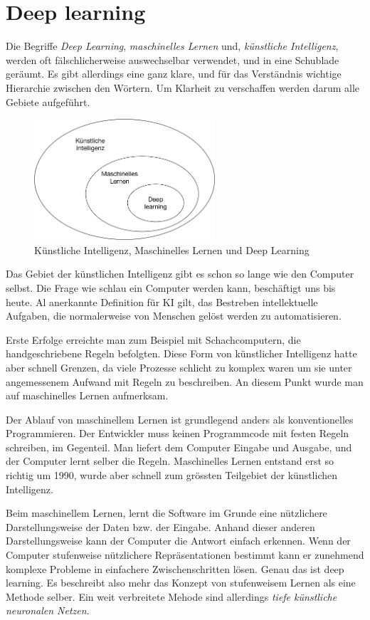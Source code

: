 \section{Deep learning}
Die Begriffe \textit{Deep Learning}, \textit{maschinelles Lernen} und, \textit{künstliche Intelligenz}, werden oft fälschlicherweise auswechselbar verwendet, und in eine Schublade geräumt. Es gibt allerdings eine ganz klare, und für das Verständnis wichtige Hierarchie zwischen den Wörtern. Um Klarheit zu verschaffen werden darum alle Gebiete aufgeführt.

\begin{figure}[hbt]
	\centering
		\includegraphics[width=0.6\textwidth]{assets/hierarchy.png}
	\caption{Künstliche Intelligenz, Maschinelles Lernen und Deep Learning}
	\label{img:hierachy}
\end{figure}

Das Gebiet der künstlichen Intelligenz gibt es schon so lange wie den Computer selbst. Die Frage wie schlau ein Computer werden kann, beschäftigt uns bis heute. Al anerkannte Definition für KI gilt, das Bestreben intellektuelle Aufgaben, die normalerweise von Menschen gelöst werden zu automatisieren.

Erste Erfolge erreichte man zum Beispiel mit Schachcomputern, die handgeschriebene Regeln befolgten. Diese Form von künstlicher Intelligenz hatte aber schnell Grenzen, da viele Prozesse schlicht zu komplex waren um sie unter angemessenem Aufwand mit Regeln zu beschreiben. An diesem Punkt wurde man auf maschinelles Lernen aufmerksam.

Der Ablauf von maschinellem Lernen ist grundlegend anders als konventionelles Programmieren. Der Entwickler muss  keinen Programmcode mit festen Regeln schreiben, im Gegenteil. Man liefert dem Computer Eingabe und Ausgabe, und der Computer lernt selber die Regeln. Maschinelles Lernen entstand erst so richtig um 1990, wurde aber schnell zum grössten Teilgebiet der künstlichen Intelligenz.

Beim maschinellem Lernen, lernt die Software im Grunde eine nützlichere Darstellungsweise der Daten bzw. der Eingabe. Anhand dieser anderen Darstellungsweise kann der Computer die Antwort einfach erkennen. Wenn der Computer stufenweise nützlichere Repräsentationen bestimmt kann er zunehmend komplexe Probleme in einfachere Zwischenschritten lösen. Genau das ist deep learning. Es beschreibt also mehr das Konzept von stufenweisem Lernen als eine Methode selber. Ein weit verbreitete Mehode sind allerdings \textit{tiefe künstliche neuronalen Netzen}\parencite[vgl.][]{chollet}.


